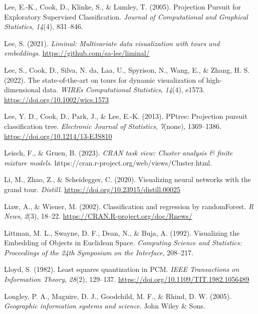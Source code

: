 \documentclass[
  letterpaper,
]{krantz}
\newlength{\cslhangindent}
\newenvironment{CSLReferences}[2] %
 {\begin{list}{}{%
  \setlength{\itemindent}{0pt}
  \setlength{\leftmargin}{0pt}
  \setlength{\parsep}{0pt}
  \ifodd #1
   \setlength{\leftmargin}{\cslhangindent}
   \setlength{\itemindent}{-1\cslhangindent}
  \fi
  \setlength{\itemsep}{#2\baselineskip}}}
 {\end{list}}
\begin{document}
\begin{CSLReferences}{1}{0}
Lee, E.-K., Cook, D., Klinke, S., \& Lumley, T. (2005). {P}rojection
{P}ursuit for {E}xploratory {S}upervised {C}lassification. \emph{Journal
of Computational and Graphical Statistics}, \emph{14}(4), 831--846.

Lee, S. (2021). \emph{Liminal: Multivariate data visualization with
tours and embeddings}. \url{https://github.com/sa-lee/liminal/}

Lee, S., Cook, D., Silva, N. da, Laa, U., Spyrison, N., Wang, E., \&
Zhang, H. S. (2022). The state-of-the-art on tours for dynamic
visualization of high-dimensional data. \emph{WIREs Computational
Statistics}, \emph{14}(4), e1573.
\url{https://doi.org/10.1002/wics.1573}

Lee, Y. D., Cook, D., Park, J., \& Lee, E.-K. (2013). {PPtree:
Projection pursuit classification tree}. \emph{Electronic Journal of
Statistics}, \emph{7}(none), 1369--1386.
\url{https://doi.org/10.1214/13-EJS810}

Leisch, F., \& Gruen, B. (2023). \emph{CRAN task view: Cluster analysis
\& finite mixture models}.
https://cran.r-project.org/web/views/Cluster.html.

Li, M., Zhao, Z., \& Scheidegger, C. (2020). Visualizing neural networks
with the grand tour. \emph{Distill}.
\url{https://doi.org/10.23915/distill.00025}

Liaw, A., \& Wiener, M. (2002). Classification and regression by
randomForest. \emph{R News}, \emph{2}(3), 18--22.
\url{https://CRAN.R-project.org/doc/Rnews/}

Littman, M. L., Swayne, D. F., Dean, N., \& Buja, A. (1992). Visualizing
the {E}mbedding of {O}bjects in {E}uclidean {S}pace. \emph{Computing
Science and Statistics: Proceedings of the 24th Symposium on the
Interface}, 208--217.

Lloyd, S. (1982). Least squares quantization in PCM. \emph{IEEE
Transactions on Information Theory}, \emph{28}(2), 129--137.
\url{https://doi.org/10.1109/TIT.1982.1056489}

Longley, P. A., Maguire, D. J., Goodchild, M. F., \& Rhind, D. W.
(2005). \emph{Geographic information systems and science}. John Wiley \&
Sons.


\end{CSLReferences}
\end{document}

